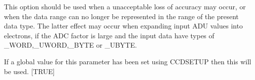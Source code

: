 {{{         This option should be used when a unacceptable loss of
         accuracy may occur, or when the data range can no longer be
         represented in the range of the present data type. The latter
         effect may occur when expanding input ADU values into
         electrons, if the ADC factor is large and the input data have
         types of \_WORD,\_UWORD,\_BYTE or \_UBYTE.

         If a global value for this parameter has been set using
         CCDSETUP then this will be used.
         [TRUE]
      }
      }}
